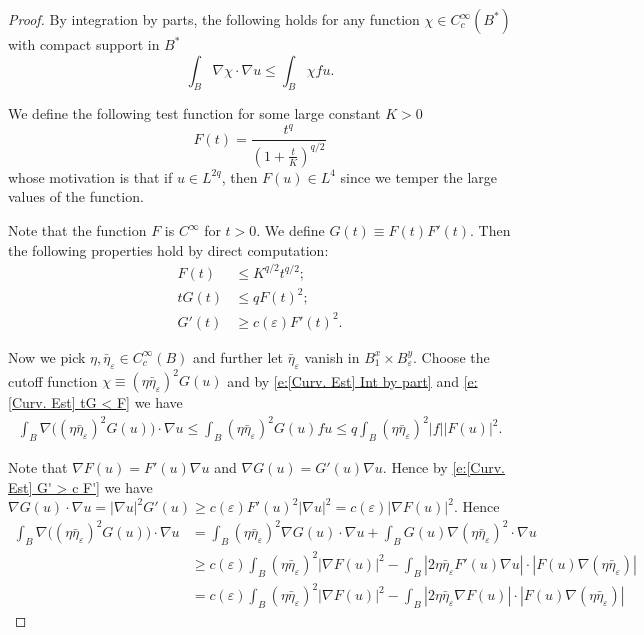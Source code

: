 \documentclass[10pt,a4paper]{amsart}
\begin{document}
\begin{proof}
    By integration by parts, the following holds for any function $\chi \in C_c^{\infty}(B^*)$ with compact support in $B^*$
    \begin{equation}\label{e:[Curv. Est] Int by part}
        \int_B \nabla \chi \cdot \nabla u \leqslant \int_B \chi f u.
    \end{equation}

We define the following test function for some large constant $K>0$
\begin{equation}
    F(t) = \frac{t^{q}}{(1 + \frac{t}{K})^{q/2}}
\end{equation}
whose motivation is that if $u\in L^{2q}$, then $F(u)\in L^4$ since we temper the large values of the function.

Note that the function $F$ is $C^{\infty}$ for $t>0$. We define $G(t) \equiv F(t) F'(t)$. Then the following properties hold by direct computation:
\begin{align}
    F(t) &\leqslant  K^{q/2} t^{q/2};\\
    tG(t) &\leqslant qF(t)^2;\label{e:[Curv. Est] tG < F}\\
    G'(t) &\geqslant c(\varepsilon) F'(t)^2. \label{e:[Curv. Est] G' > c F'}
\end{align}


Now we pick $\eta, \bar{\eta}_{\varepsilon} \in C_c^{\infty}(B)$ and further let $\bar{\eta}_{\varepsilon}$ vanish in $B_1^x \times B_{\varepsilon}^y$. Choose the cutoff function $\chi \equiv (\eta \bar{\eta}_{\varepsilon})^2 G(u)$ and by \eqref{e:[Curv. Est] Int by part} and \eqref{e:[Curv. Est] tG < F} we have
\begin{align}\label{eq:control nablaG nablau}
    \int_{B} \nabla \Big( (\eta \bar{\eta}_{\varepsilon})^2 G(u)\Big) \cdot \nabla u \leqslant \int_{B} (\eta \bar{\eta}_{\varepsilon})^2 G(u) f u \leqslant q \int_{B} (\eta \bar{\eta}_{\varepsilon})^2  |f| |F(u)|^2.
\end{align}

Note that $\nabla F(u) = F'(u) \nabla u$ and $\nabla G(u)= G'(u) \nabla u$. Hence by \eqref{e:[Curv. Est] G' > c F'} we have $\nabla G(u) \cdot \nabla u = |\nabla u|^2 G'(u) \geqslant c(\varepsilon) F'(u)^2 |\nabla u|^2 = c(\varepsilon)|\nabla F(u)|^2$. Hence
\begin{align}
    \int_{B} \nabla \Big( (\eta \bar{\eta}_{\varepsilon})^2 G(u)\Big) \cdot \nabla u &= \int_B (\eta \bar{\eta}_{\varepsilon})^2 \nabla G(u) \cdot \nabla u + \int_B G(u) \nabla (\eta \bar{\eta}_{\varepsilon})^2 \cdot \nabla u \\
    &\geqslant c(\varepsilon) \int_B (\eta \bar{\eta}_{\varepsilon})^2 |\nabla F(u)|^2- \int_B    |2 \eta \bar{\eta}_{\varepsilon} F'(u) \nabla u| \cdot  |  F(u) \nabla(\eta \bar{\eta}_{\varepsilon}) |   \\
    &= c(\varepsilon) \int_B (\eta \bar{\eta}_{\varepsilon})^2 |\nabla F(u)|^2- \int_B    |2 \eta \bar{\eta}_{\varepsilon} \nabla F(u)| \cdot  |  F(u) \nabla(\eta \bar{\eta}_{\varepsilon}) |
\end{align}



\end{proof}
\end{document}
